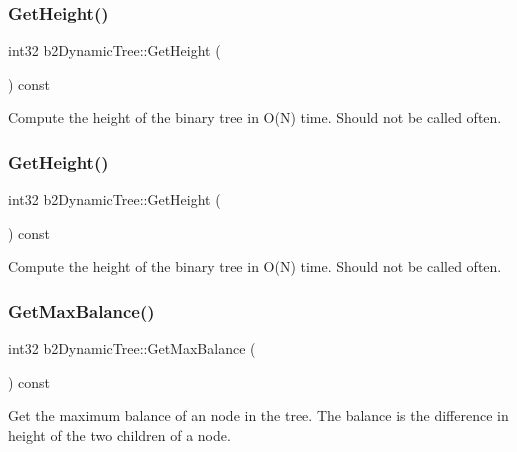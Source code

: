 \subsubsection{\texorpdfstring{Get\+Height()}{GetHeight()}\hspace{0.1cm}{\footnotesize\ttfamily [1/2]}}
{\footnotesize\ttfamily int32 b2\+Dynamic\+Tree\+::\+Get\+Height (\begin{DoxyParamCaption}{ }\end{DoxyParamCaption}) const}

Compute the height of the binary tree in O(\+N) time. Should not be called often. \mbox{\label{classb2DynamicTree_ae3c7dc771d596f1f95fd3a3d7f2f3e97}} 
\subsubsection{\texorpdfstring{Get\+Height()}{GetHeight()}\hspace{0.1cm}{\footnotesize\ttfamily [2/2]}}
{\footnotesize\ttfamily int32 b2\+Dynamic\+Tree\+::\+Get\+Height (\begin{DoxyParamCaption}{ }\end{DoxyParamCaption}) const}

Compute the height of the binary tree in O(\+N) time. Should not be called often. \mbox{\label{classb2DynamicTree_a3feab170229e0acd17f6a4ad3fca406e}} 
\subsubsection{\texorpdfstring{Get\+Max\+Balance()}{GetMaxBalance()}\hspace{0.1cm}{\footnotesize\ttfamily [1/2]}}
{\footnotesize\ttfamily int32 b2\+Dynamic\+Tree\+::\+Get\+Max\+Balance (\begin{DoxyParamCaption}{ }\end{DoxyParamCaption}) const}

Get the maximum balance of an node in the tree. The balance is the difference in height of the two children of a node. \mbox{\label{classb2DynamicTree_a3feab170229e0acd17f6a4ad3fca406e}} 
